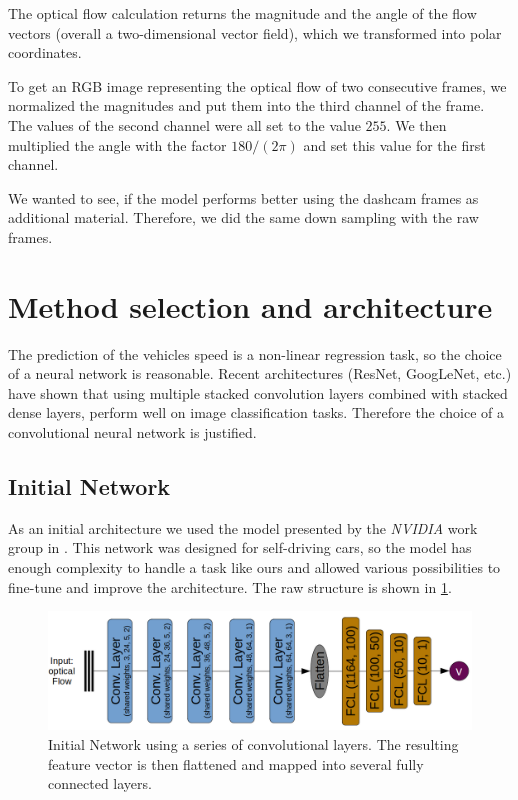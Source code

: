\documentclass[conference]{IEEEtran}
\begin{document}
The optical flow calculation returns the magnitude and
the angle of the flow vectors (overall a two-dimensional vector field), which we transformed into polar 
coordinates.

To get an RGB image representing the
optical flow of two consecutive frames, we normalized the magnitudes and put them into the third channel 
of the frame. The values
of the second channel were all set to the value $255$. We then multiplied the angle with the factor 
$180/(2\pi)$ and set this value 
for the first channel.

We wanted to see, if the model performs better using the dashcam frames as additional material. 
Therefore, we did the same down sampling with the raw frames.

\section{Method selection and architecture}
The prediction of the vehicles speed is a non-linear regression task, so the choice of a neural network 
is reasonable. Recent architectures (ResNet, GoogLeNet, etc.) have shown that using multiple stacked 
convolution layers combined with stacked dense layers, perform well on image classification tasks. 
Therefore the choice of a convolutional neural network is justified.

\subsection{Initial Network}
As an initial architecture we used the model presented by the \emph{NVIDIA} work group in 
\cite{NVIDIA2016}. This network was designed for self-driving cars, so the model has enough complexity 
to handle a task like ours and allowed various possibilities to fine-tune and improve the architecture. 
The raw structure is shown in \cref{fig:initialNetwork}.
\begin{figure}[ht]
	\centering
	\includegraphics[width=0.9\columnwidth]{imgs/InitialNetwork.png}
	\caption{Initial Network using a series of convolutional layers. The resulting feature vector is 
	then flattened and mapped into several fully connected layers.}
	\label{fig:initialNetwork}
\end{figure}
\end{document}
